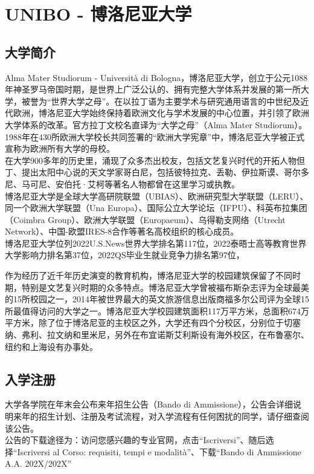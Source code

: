 \chapter{UNIBO - 博洛尼亚大学}    

\section{大学简介}
Alma Mater Studiorum - Università di Bologna，博洛尼亚大学，创立于公元1088年神圣罗马帝国时期，是世界上广泛公认的、拥有完整大学体系并发展的第一所大学，被誉为“世界大学之母”。在以拉丁语为主要学术与研究通用语言的中世纪及近代欧洲，博洛尼亚大学始终保持着欧洲文化与学术发展的中心位置，并引领了欧洲大学体系的改革。官方拉丁文校名直译为“大学之母”（Alma Mater Studiorum）。1988年在430所欧洲大学校长共同签署的“欧洲大学宪章”中，博洛尼亚大学被正式宣称为欧洲所有大学的母校。\\
在大学900多年的历史里，涌现了众多杰出校友，包括文艺复兴时代的开拓人物但丁、提出太阳中心说的天文学家哥白尼，包括彼特拉克、丢勒、伊拉斯谟、哥尔多尼、马可尼、安伯托·艾柯等著名人物都曾在这里学习或执教。\\ 
博洛尼亚大学是全球大学高研院联盟（UBIAS）、欧洲研究型大学联盟（LERU）、同一个欧洲大学联盟（Una Europa）、国际公立大学论坛（IFPU）、科英布拉集团（Coimbra Group）、欧洲大学联盟（Europaeum）、乌得勒支网络（Utrecht Network）、中国-欧盟IRES-8合作等著名高校组织的核心成员。\\
博洛尼亚大学位列2022U.S.News世界大学排名第117位，2022泰晤士高等教育世界大学影响力排名第37位，2022QS毕业生就业竞争力排名第97位，

作为经历了近千年历史演变的教育机构，博洛尼亚大学的校园建筑保留了不同时期，特别是文艺复兴时期的众多特点。博洛尼亚大学曾被福布斯杂志评为全球最美的15所校园之一，2014年被世界最大的英文旅游信息出版商福多尔公司评为全球15所最值得访问的大学之一。博洛尼亚大学校园建筑面积117万平方米，总面积674万平方米，除了位于博洛尼亚的主校区之外，大学还有四个分校区，分别位于切塞纳、弗利、拉文纳和里米尼，另外在布宜诺斯艾利斯设有海外校区，在布鲁塞尔、纽约和上海设有办事处。

\section{入学注册}         

大学各学院在年末会公布来年招生公告（Bando di Ammissione），公告会详细说明来年的招生计划、注册及考试流程，对入学流程有任何困扰的同学，请仔细查阅该公告。\\
公告的下载途径为：访问您感兴趣的专业官网，点击“Iscriversi”、随后选择“Iscriversi al Corso: requisiti, tempi e modalità”、下载“Bando di Ammissione A.A. 202X/202X”

